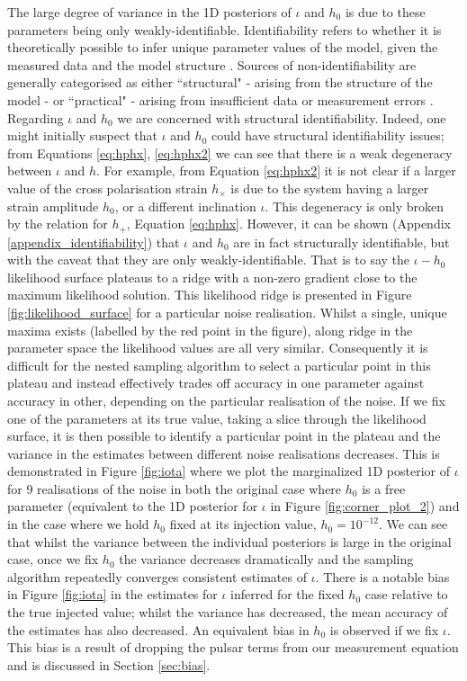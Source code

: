 \documentclass[fleqn,usenatbib,useAMS]{mnras}
\begin{document}
The large degree of variance in the 1D posteriors of $\iota$ and $h_0$ is due to these parameters being only weakly-identifiable. Identifiability refers to whether it is theoretically possible to infer unique parameter values of the model, given the measured data and the model structure \citep{e5be7c83a0d24500826f6e1b414d1733}. Sources of non-identifiability are generally categorised as either ``structural" - arising from the structure of the model - or ``practical" - arising from insufficient data or measurement errors \citep{GUILLAUME2019418}. Regarding $\iota$ and $h_0$ we are concerned with structural identifiability. Indeed, one might initially suspect that $\iota$ and $h_0$ could have structural identifiability issues; from Equations \ref{eq:hphx}, \ref{eq:hphx2} we can see that there is a weak degeneracy between $\iota$ and $h$. For example, from Equation \eqref{eq:hphx2} it is not clear if a larger value of the cross polarisation strain $h_{\times}$ is due to the system having a larger strain amplitude $h_0$, or a different inclination $\iota$. This degeneracy is only broken by the relation for $h_{+}$, Equation \eqref{eq:hphx}. However, it can be shown (Appendix \ref{appendix_identifiability}) that $\iota$ and $h_0$ are in fact structurally identifiable, but with the caveat that they are only weakly-identifiable. That is to say the $\iota-h_0$ likelihood surface plateaus to a ridge with a non-zero gradient close to the maximum likelihood solution. This likelihood ridge is presented in Figure \ref{fig:likelihood_surface} for a particular noise realisation. Whilst a single, unique maxima exists (labelled by the red point in the figure), along ridge in the parameter space the likelihood values are all very similar. Consequently it is difficult for the nested sampling algorithm to select a particular point in this plateau and instead effectively trades off accuracy in one parameter against accuracy in other, depending on the particular realisation of the noise. If we fix one of the parameters at its true value, taking a slice through the likelihood surface, it is then possible to identify a particular point in the plateau and the variance in the estimates between different noise realisations decreases. This is demonstrated in Figure \ref{fig:iota} where we plot the marginalized 1D posterior of $\iota$ for 9 realisations of the noise in both the original case where $h_0$ is a free parameter (equivalent to the 1D posterior for $\iota$ in Figure \ref{fig:corner_plot_2}) and in the case where we hold $h_0$ fixed at its injection value, $h_0 = 10^{-12}$. We can see that whilst the variance between the individual posteriors is large in the original case, once we fix $h_0$ the variance decreases dramatically and the sampling algorithm repeatedly converges consistent estimates of $\iota$. There is a notable bias in Figure \ref{fig:iota} in the estimates for $\iota$ inferred for the fixed $h_0$ case relative to the true injected value; whilst the variance has decreased, the mean accuracy of the estimates has also decreased. An equivalent bias in $h_0$ is observed if we fix $\iota$. This bias is a result of dropping the pulsar terms from our measurement equation and is discussed in Section \ref{sec:bias}. \newline 
\end{document}
